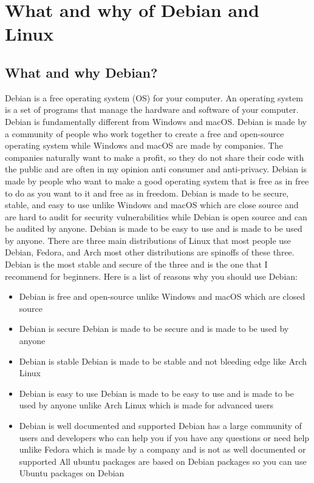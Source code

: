 \chapter{What and why of Debian and Linux}
\section{What and why Debian?}
Debian is a free operating system (OS) for your computer. An operating system is a set of programs that manage the hardware and software of your computer. Debian is fundamentally different from Windows and macOS. Debian is made by a community of people who work together to create a free and open-source operating system while Windows and macOS are made by companies. The companies naturally want to make a profit, so they do not share their code with the public and are often in my opinion anti consumer and anti-privacy. Debian is made by people who want to make a good operating system that is free as in free to do as you want to it and free as in freedom. Debian is made to be secure, stable, and easy to use unlike Windows and macOS which are close source and are hard to audit for security vulnerabilities while Debian is open source and can be audited by anyone. Debian is made to be easy to use and is made to be used by anyone. There are three main distributions of Linux that most people use Debian, Fedora, and Arch most other distributions are spinoffs of these three. Debian is the most stable and secure of the three and is the one that I recommend for beginners. Here is a list of reasons why you should use Debian: 
\begin{itemize}
    \item Debian is free and open-source
    \subitem unlike Windows and macOS which are closed source
    \item Debian is secure
    \subitem Debian is made to be secure and is made to be used by anyone
    \item Debian is stable
    \subitem Debian is made to be stable and not bleeding edge like Arch Linux
    \item Debian is easy to use 
    \subitem Debian is made to be easy to use and is made to be used by anyone unlike Arch Linux which is made for advanced users 
    \item Debian is well documented and supported
    \subitem Debian has a large community of users and developers who can help you if you have any questions or need help unlike Fedora which is made by a company and is not as well documented or supported 
    \subitem All ubuntu packages are based on Debian packages so you can use Ubuntu packages on Debian
\end{itemize}

